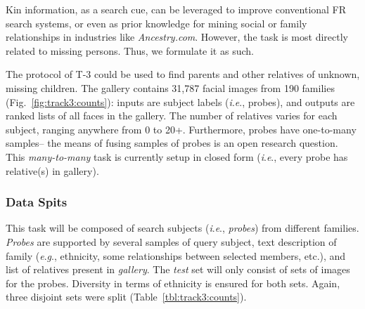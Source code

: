 \documentclass[letterpaper, 10 pt, conference]{ieeeconf}  %
\newcommand{\ie}{\textit{i}.\textit{e}., }
\newcommand{\eg}{\textit{e}.\textit{g}., }
\begin{document}
Kin information, as a search cue, can be leveraged to improve conventional FR search systems, or even as prior knowledge for mining social or family relationships in industries like \textit{Ancestry.com}. However, the task is most directly related to missing persons. Thus, we formulate it as such.




The protocol of T-3 could be used to find parents and other relatives of unknown, missing children. The gallery contains 31,787 facial images from 190 families (Fig.~\ref{fig:track3:counts}): inputs are subject labels (\ie probes), and outputs are ranked lists of all faces in the gallery. The number of relatives varies for each subject, ranging anywhere from 0 to 20+. Furthermore, probes have one-to-many samples-- the means of fusing samples of probes is an open research question. This \textit{many-to-many} task is currently setup in closed form (\ie every probe has relative(s) in gallery).
%


\subsubsection{Data Spits}
This task will be composed of search subjects (\ie \textit{probes}) from different families. \textit{Probes} are supported by several samples of query subject, text description of family (\eg ethnicity, some relationships between selected members, etc.), and list of relatives present in \textit{gallery}. The \textit{test} set will only consist of sets of images for the probes. Diversity in terms of ethnicity is ensured for both sets. Again, three disjoint sets were split (Table~\ref{tbl:track3:counts}).
\end{document}
